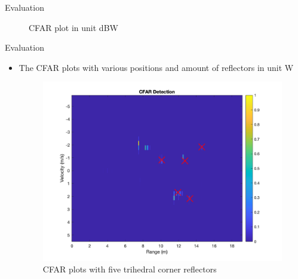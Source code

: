 \documentclass{beamer}
\begin{document}
\begin{frame}[t]{Evaluation}
\begin{itemize}
\begin{figure}
\begin{minipage}{0.45\textwidth}
                    \caption{CFAR plot in unit dBW}
                \end{minipage}
            \end{figure}
	\end{itemize}
\end{frame}





\begin{frame}[t]{Evaluation}
	\begin{itemize}
	    \item The CFAR plots with various positions and amount of reflectors in unit W
        \vspace{0.5\baselineskip}
            \begin{figure}
                \centering
                \begin{minipage}{0.45\textwidth}
                    \centering
                    \includegraphics[height=0.8\textwidth]{figures/4c_empty.png}
                    \caption{CFAR plots with five trihedral corner reflectors}
                \end{minipage}
                \begin{minipage}{0.45\textwidth}
                    \centering

\end{minipage}
\end{figure}
\end{itemize}
\end{frame}
\end{document}
